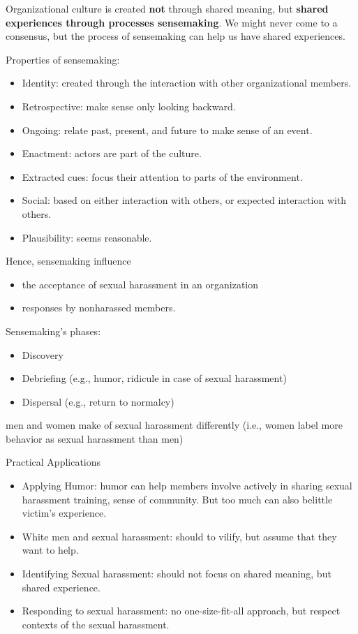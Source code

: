 \documentclass[
]{book}
\providecommand{\tightlist}{%
  \setlength{\itemsep}{0pt}\setlength{\parskip}{0pt}}
\begin{document}
Organizational culture is created \textbf{not} through shared meaning, but \textbf{shared experiences through processes
sensemaking}. We might never come to a consensus, but the process of sensemaking can help us have shared experiences.

Properties of sensemaking:

\begin{itemize}
\tightlist
\item
  Identity: created through the interaction with other organizational members.
\item
  Retrospective: make sense only looking backward.
\item
  Ongoing: relate past, present, and future to make sense of an event.
\item
  Enactment: actors are part of the culture.
\item
  Extracted cues: focus their attention to parts of the environment.
\item
  Social: based on either interaction with others, or expected interaction with others.
\item
  Plausibility: seems reasonable.
\end{itemize}

Hence, sensemaking influence

\begin{itemize}
\tightlist
\item
  the acceptance of sexual harassment in an organization
\item
  responses by nonharassed members.
\end{itemize}

Sensemaking's phases:

\begin{itemize}
\tightlist
\item
  Discovery
\item
  Debriefing (e.g., humor, ridicule in case of sexual harassment)
\item
  Dispersal (e.g., return to normalcy)
\end{itemize}

men and women make of sexual harassment differently (i.e., women label more behavior as sexual harassment than men)

Practical Applications

\begin{itemize}
\tightlist
\item
  Applying Humor: humor can help members involve actively in sharing sexual harassment training, sense of community.
  But too much can also belittle victim's experience.
\item
  White men and sexual harassment: should to vilify, but assume that they want to help.
\item
  Identifying Sexual harassment: should not focus on shared meaning, but shared experience.
\item
  Responding to sexual harassment: no one-size-fit-all approach, but respect contexts of the sexual harassment.
\end{itemize}
\end{document}

